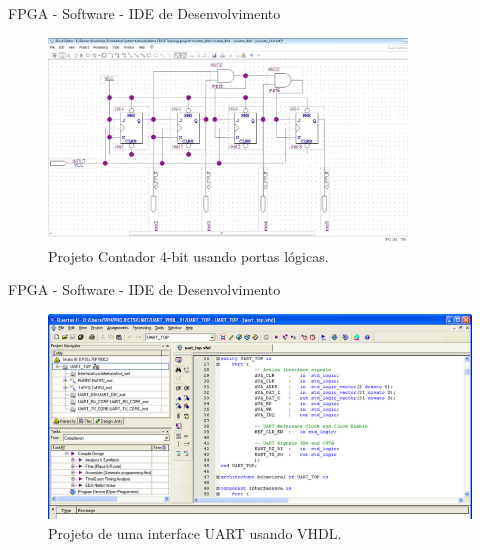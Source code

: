 	\begin{frame}{FPGA - Software - IDE de Desenvolvimento}
        \vspace{-1em}
		\begin{figure}[p]
			\centering
			\includegraphics[width=0.85\textwidth]{img/fpga/software_quartus_portas2.jpg}
			\caption{Projeto Contador 4-bit usando portas lógicas.}
			\label{fig:alteraquartus_portas2}
		\end{figure}
	\end{frame}

	\begin{frame}{FPGA - Software - IDE de Desenvolvimento}
        \vspace{-1em}
		\begin{figure}[p]
			\centering
			\includegraphics[width=1\textwidth]{img/fpga/software_quartus_vhdl.png}
			\caption{Projeto de uma interface UART usando VHDL.}
			\label{fig:alteraquartus_portas}
		\end{figure}
	\end{frame}

